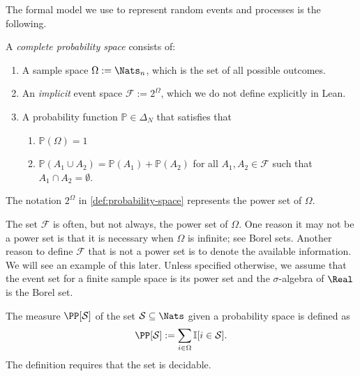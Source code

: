 The formal model we use to represent random events and processes is the following.
\begin{definition} \label{def:probability-space}
  A \emph{complete probability space} consists of:
  \begin{enumerate}
  \item A sample space $\Omega := \Nats_n$, which is the set of all possible outcomes. 
  \item An \emph{implicit} event space $\mathcal{F} := 2^{\Omega}$, which we do not define explicitly in Lean. 
  \item A probability function $\mathbb{P} \in \Delta_N$ that satisfies that
  \begin{enumerate}
  \item $\mathbb{P}(\Omega) = 1$
  \item $\mathbb{P}(A_1 \cup A_2) = \mathbb{P}(A_1) + \mathbb{P}(A_2)$ for all $A_1, A_2\in \mathcal{F}$ such that $A_1 \cap A_2 = \emptyset$.
  \end{enumerate}
  \end{enumerate}
\end{definition}
The notation $2^{\Omega}$ in \cref{def:probability-space} represents the power set of $\Omega$.

The set $\mathcal{F}$ is often, but not always, the power set of $\Omega$. One reason it may not be a power set is that it is necessary when $\Omega$ is infinite; see Borel sets. Another reason to define $\mathcal{F}$ that is not a power set is to denote the available information. We will see an example of this later. Unless specified otherwise, we assume that the event set for a finite sample space is its power set and the $\sigma$-algebra of $\Real$ is the Borel set.

\begin{definition}[Measure]
  The measure $\PP [\mathcal{S}]$ of the set $\mathcal{S} \subseteq \Nats$ given a probability space is defined as
  \[
   \PP [\mathcal{S}] := \sum_{i \in \Omega} \mathbb{I}[ i\in \mathcal{S} ].
 \]
 The definition requires that the set is decidable. 
\end{definition}


